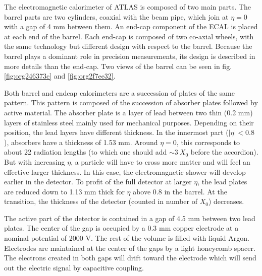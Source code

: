 The electromagnetic calorimeter of ATLAS is composed of two main parts.
The barrel parts are two cylinders, coaxial with the beam pipe, which join at $\eta=0$ with a gap of 4 mm between them.
An end-cap component of the ECAL is placed at each end of the barrel.
Each end-cap is composed of two co-axial wheels, with the same technology but different design with respect to the barrel.
Because the barrel plays a dominant role in precision measurements, its design is described in more details than the end-cap.
Two views of the barrel can be seen in fig. \ref{fig:org246373c} and \ref{fig:org2f7ee32}.



Both barrel and endcap calorimeters are a succession of plates of the same pattern.
This pattern is composed of the succession of absorber plates followed by active material.
The absorber plate is a layer of lead between two thin (0.2 mm) layers of stainless steel mainly used for mechanical purposes.
Depending on their position, the lead layers have different thickness.
In the innermost part ($|\eta|<0.8$), absorbers have a thickness of 1.53 mm.
Around $\eta=0$, this corresponds to about 22 radiation lengths (to which one should add \(\sim 3\ X_0\) before the accordion).
But with increasing $\eta$, a particle will have to cross more matter and will feel an effective larger thickness.
In this case, the electromagnetic shower will develop earlier in the detector.
To profit of the full detector at larger $\eta$, the lead plates are reduced down to 1.13 mm thick for $\eta$ above 0.8 in the barrel.
At the transition, the thickness of the detector (counted in number of $X_0$) decreases.

The active part of the detector is contained in a gap of 4.5 mm between two lead plates.
The center of the gap is occupied by a 0.3 mm copper electrode at a nominal potential of 2000 V.
The rest of the volume is filled with liquid Argon.
Electrodes are maintained at the center of the gaps by a light honeycomb spacer.
The electrons created in both gaps will drift toward the electrode which will send out the electric signal by capacitive coupling.

